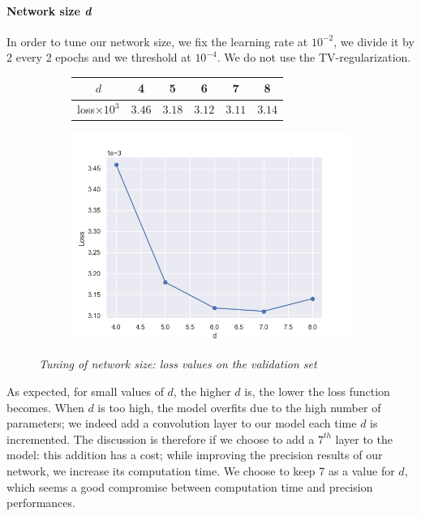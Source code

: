 \documentclass{article}
\begin{document}
        \paragraph{Network size \textit{d}}
        \label{par:hpp-d}
        In order to tune our network size, we fix the learning rate at $10^{-2}$, we divide it by 2 every 2 epochs and we threshold at $10^{-4}$. We do not use the TV-regularization.

        \begin{figure}[!ht]
            \begin{subfigure}{.4\linewidth}
                \centering
                \begin{tabular}{|c|c|c|c|c|c|}
                    \hline
                    $d$ & 4 & 5 & 6 & 7 & 8 \\
                    \hline \hline
                    loss$\times 10^3$ & $3.46$ & $3.18$ & $3.12$ & $3.11$ & $3.14$ \\
                    \hline
                \end{tabular}
            \end{subfigure}
            \begin{subfigure}{.59\linewidth}
                \centering
                \includegraphics[width=.8\linewidth]{pics/hpp-d-8.png}
            \end{subfigure}
            \caption{\textit{Tuning of network size: loss values on the validation set}}
        \end{figure}
        \par
        As expected, for small values of $d$, the higher $d$ is, the lower the loss function becomes. When $d$ is too high, the model overfits due to the high number of parameters; we indeed add a convolution layer to our model each time $d$ is incremented. The discussion is therefore if we choose to add a $7^{th}$ layer to the model: this addition has a cost; while improving the precision results of our network, we increase its computation time. We choose to keep 7 as a value for $d$, which seems a good compromise between computation time and precision performances.
\end{document}
